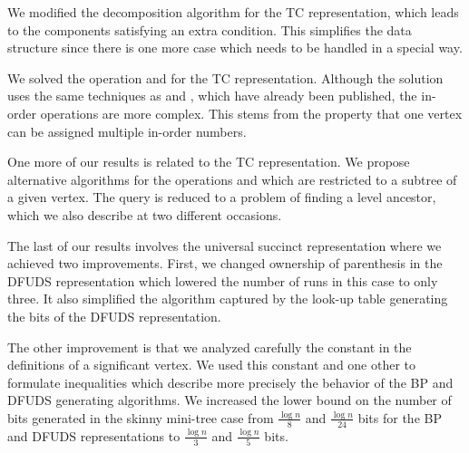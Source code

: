 We modified the decomposition algorithm for the TC representation, which leads to the components satisfying an extra condition.
This simplifies the data structure since there is one more case which needs to be handled in a special way.

We solved the operation \inRank{} and \inSelect{} for the TC representation.
Although the solution uses the same techniques as \dfudsRank{} and \dfudsSelect{}, which have already been published, the in-order operations are more complex.
This stems from the property that one vertex can be assigned multiple in-order numbers.

One more of our results is related to the TC representation.
We propose alternative algorithms for the operations \levelFirst{} and \levelLast{} which are restricted to a subtree of a given vertex.
The query is reduced to a problem of finding a level ancestor, which we also describe at two different occasions.

The last of our results involves the universal succinct representation where we achieved two improvements.
First, we changed ownership of parenthesis in the DFUDS representation which lowered the number of runs in this case to only three.
It also simplified the algorithm captured by the look-up table generating the bits of the DFUDS representation.

The other improvement is that we analyzed carefully the constant in the definitions of a significant vertex.
We used this constant and one other to formulate inequalities which describe more precisely the behavior of the BP and DFUDS generating algorithms.
We increased the lower bound on the number of bits generated in the skinny mini-tree case from $\frac{\log n}{8}$ and $\frac{\log n}{24}$ bits for the BP and DFUDS representations to $\frac{\log n}{3}$ and $\frac{\log n}{5}$ bits.

